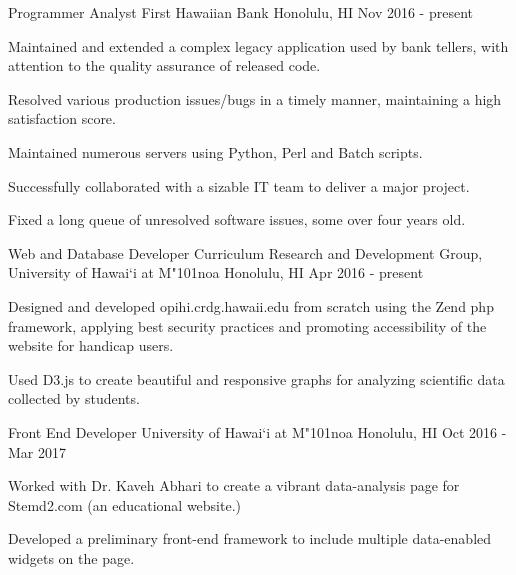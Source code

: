 \begin{cventries}
   	\cventry
    {Programmer Analyst}
    {First Hawaiian Bank}
    {Honolulu, HI}
    {Nov 2016 - present}
    {
        \begin{cvitems}
            \item {Maintained and extended a complex legacy application used by bank tellers, with attention to the quality assurance of released code.}
            \item {Resolved various production issues/bugs in a timely manner, maintaining a high satisfaction score.}
            \item {Maintained numerous servers using Python, Perl and Batch scripts.}
            \item {Successfully collaborated with a sizable IT team to deliver a major project.}
            \item {Fixed a long queue of unresolved software issues, some over four years old.}
        \end{cvitems}
    }

	\cventry
	{Web and Database Developer}
	{Curriculum Research and Development Group, University of Hawai`i at M{\char"101}noa}
	{Honolulu, HI}
	{Apr 2016 - present}
	{
		\begin{cvitems}
			\item {Designed and developed opihi.crdg.hawaii.edu from scratch using the Zend php framework, applying best security practices and promoting accessibility of the website for handicap users.}
			\item {Used D3.js to create beautiful and responsive graphs for analyzing scientific data collected by students.}
		\end{cvitems}
	}


	\cventry
	{Front End Developer}
	{University of Hawai`i at M{\char"101}noa}
	{Honolulu, HI}
	{Oct 2016 - Mar 2017}
	{
		\begin{cvitems}
			\item {Worked with Dr. Kaveh Abhari to create a vibrant data-analysis page for Stemd2.com (an educational website.)}
			\item {Developed a preliminary front-end framework to include multiple data-enabled widgets on the page.}
		\end{cvitems}
	}


\end{cventries}
